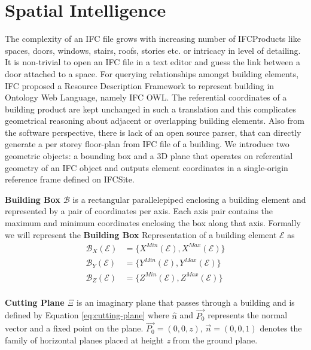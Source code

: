 \documentclass[conference]{IEEEtran}
\begin{document}
 



\section{Spatial Intelligence }
\label{section:spatial}

The complexity of an IFC file grows with increasing number of IFCProducts like spaces, doors, windows, stairs, roofs, stories etc. or intricacy in level of detailing. It is non-trivial to open an IFC file in a text editor and guess the link between a door attached to a space. For querying relationships amongst building elements, IFC proposed a Resource Description Framework to represent building in Ontology Web Language, namely IFC OWL. The referential coordinates of a building product are kept unchanged in such a translation and this complicates geometrical reasoning about adjacent or overlapping building elements. Also from the software perspective, there is lack of an open source parser, that can directly generate a per storey floor-plan from IFC file of a building.
We introduce two geometric objects: a bounding box and a 3D plane that operates on referential geometry of an IFC object and outputs element coordinates in a single-origin reference frame defined on IFCSite. 


\textbf{Building Box $\mathcal{B}$} is a rectangular parallelepiped enclosing a building element and represented by a pair of coordinates per axis. Each axis pair contains the maximum and minimum coordinates enclosing the box along that axis. Formally we will represent the \textbf{Building Box} Representation of a building element $\mathcal{E}$ as 
\begin{equation}
  \begin{aligned}
  \mathcal{B}_X(\mathcal{E}) &= \{ X^{Min}(\mathcal{E}) ,  X^{Max}(\mathcal{E})   \} \\
  \mathcal{B}_Y(\mathcal{E}) &= \{ Y^{Min}(\mathcal{E}) ,  Y^{Max}(\mathcal{E})   \} \\
  \mathcal{B}_Z(\mathcal{E}) &= \{ Z^{Min}(\mathcal{E}) ,  Z^{Max}(\mathcal{E})   \} \\
      \end{aligned}
\end{equation}

\textbf{Cutting Plane $\Xi$} is an imaginary plane that passes through a building and is defined by Equation \ref{eq:cutting-plane} where $\hat{n}$ and $\vec{P_0}$ represents the normal vector and a fixed point on the plane. $\vec{P_0} = (0,0,z)$, $\vec{n}=(0,0,1)$ denotes the family of horizontal planes placed at height \textit{z} from the ground plane. 
\end{document}
